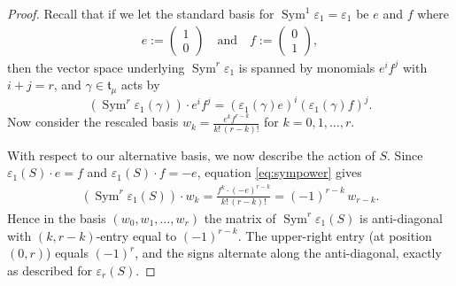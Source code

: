 \documentclass[10pt,a4paper]{amsart}
\DeclareMathOperator{\Sym}{Sym}
\begin{document}
\begin{proof}
    Recall that if we let the standard basis for $\Sym^1\varepsilon_1 = \varepsilon_1$ be $e$ and $f$ where
        \begin{eqnarray*}
            e := \left(
                \begin{matrix}
                    1\\0
                \end{matrix}\right) 
            \quad \text{and} \quad
            f := \left(
                \begin{matrix}
                    0\\1
                \end{matrix}\right),
    \end{eqnarray*}
    then the vector space underlying $\Sym^r\varepsilon_1$ is spanned by monomials $e^if^j$ with $i+j=r$, and $\gamma\in \mathfrak{t}_\mu $ acts by
        \begin{equation}\label{eq:sympower}
            \left(\Sym^r\varepsilon_1(\gamma)\right) \cdot e^if^j = (\varepsilon_1(\gamma)e)^i(\varepsilon_1(\gamma)f)^j.    
        \end{equation}
    Now consider the rescaled basis $ w_k = \frac{e^k f^{r-k}}{k!\,(r-k)!}$ for $ k=0,1,\ldots,r $.

    With respect to our alternative basis, we now describe the {action of $ S $.} Since $ \varepsilon_1(S)\cdot e = f $ and $ \varepsilon_1(S) \cdot f = -e $, equation \eqref{eq:sympower} gives
        \begin{eqnarray*}
            \left(\Sym^r\varepsilon_1(S)\right)\cdot w_k = \frac{f^k\cdot(-e)^{r-k}}{k!\,(r-k)!} = (-1)^{r-k}\,w_{r-k}.
        \end{eqnarray*}
    Hence in the basis $(w_0, w_1, \ldots, w_r)$ the matrix of $\Sym^r\varepsilon_1(S)$ is anti-diagonal with $(k,r-k)$-entry equal to $(-1)^{r-k}$. The upper-right entry (at position $(0,r)$) equals $(-1)^r$, and the signs alternate along the anti-diagonal, exactly as described for $\varepsilon_r(S)$.


\end{proof}
\end{document}
